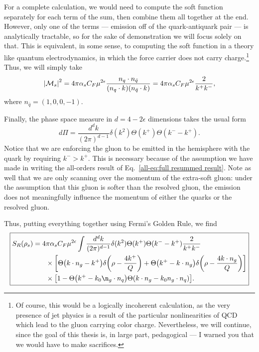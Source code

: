 \documentclass[../thesis.tex]{subfiles}
\providecommand{\cM}{\mathcal{M}}
\begin{document}
	For a complete calculation, we would need to compute the soft function separately for each term of the sum, then combine them all together at the end. However, only one of the terms --- emission off of the quark-antiquark pair --- is analytically tractable, so for the sake of demonstration we will focus solely on that. This is equivalent, in some sense, to computing the soft function in a theory like quantum electrodynamics, in which the force carrier does not carry charge.\footnote{Of course, this would be a logically incoherent calculation, as the very presence of jet physics is a result of the particular nonlinearities of QCD which lead to the gluon carrying color charge. Nevertheless, we will continue, since the goal of this thesis is, in large part, pedagogical --- I warned you that we would have to make sacrifices.} Thus, we will simply take
	\begin{equation}
		\abs{\cM_s}^2 = 4\pi\alpha_s C_F \mu^{2\epsilon} \frac{n_q \cdot n_{\bar q}}{(n_q \cdot k) (n_{\bar q} \cdot k)} = 4\pi\alpha_s C_F \mu^{2\epsilon} \frac{2}{k^+ k^-},
	\end{equation}
	where $n_{\bar q} = (1, 0, 0, -1)$.

	Finally, the phase space measure in $d = 4 - 2\epsilon$ dimensions takes the usual form
	\begin{equation}
		d\Pi = \frac{d^d k}{(2 \pi)^{d - 1}} \delta(k^2) \Theta(k^+) \Theta(k^- - k^+).
	\end{equation}
	Notice that we are enforcing the gluon to be emitted in the hemisphere with the quark by requiring $k^- > k^+$. This is necessary because of the assumption we have made in writing the all-orders result of Eq.~\ref{all-eq:full resummed result}. Note as well that we are only scanning over the momentum of the extra-soft gluon: under the assumption that this gluon is softer than the resolved gluon, the emission does not meaningfully influence the momentum of either the quarks or the resolved gluon.

	Thus, putting everything together using Fermi's Golden Rule, we find
	\begin{equation}\label{all-eq:soft function general coords}
	\boxed{
	\begin{aligned}
		S_R(\rho_s) = 4&\pi\alpha_s C_F \mu^{2\epsilon} \int \frac{d^d k}{(2\pi)^{d - 1}} \delta(k^2) \Theta(k^+) \Theta(k^- - k^+) \frac{2}{k^+ k^-} \\
		&\times \qty[\Theta\qty(k \cdot n_g - k^+) \delta\qty(\rho - \frac{4 k^+}{Q}) + \Theta\qty(k^+ - k \cdot n_g) \delta\qty(\rho - \frac{4 k \cdot n_g}{Q})] \\
		&\times \qty[1 - \Theta\qty(k^+ - k_0 \n_g \cdot n_q) \Theta(k\cdot n_g - k_0 n_g \cdot n_q)].
	\end{aligned}
	}
	\end{equation}
\end{document}
